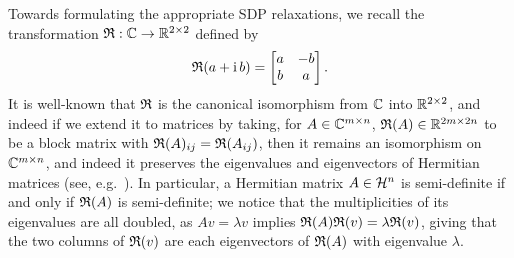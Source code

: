 Towards formulating the appropriate SDP relaxations, we recall the transformation $\mathfrak{R} : \mathbb{C} \to \mathbb{R}^{2 \times 2}$ %
defined by \[\mathfrak{R}(a + \mathrm{i}\, b) = \begin{bmatrix} a & -b \\ b & a \end{bmatrix}.\]  It is well-known that $\mathfrak{R}$ is the canonical isomorphism from $\mathbb{C}$ into $\mathbb{R}^{2 \times 2}$, and indeed if we extend it to matrices by taking, for $A \in \mathbb{C}^{m \times n}$, $\mathfrak{R}(A) \in \mathbb{R}^{2m \times 2n}$ to be a block matrix with $\mathfrak{R}(A)_{ij} = \mathfrak{R}(A_{ij})$, then it remains an isomorphism on $\mathbb{C}^{m \times n}$, and indeed it preserves the eigenvalues and eigenvectors of Hermitian matrices (see, e.g.~\cite[p.~101]{wedderburn1934matrices}).  In particular, a Hermitian matrix $A \in \mathcal{H}^n$ is semi-definite if and only if $\mathfrak{R}(A)$ is semi-definite; we notice that the multiplicities of its eigenvalues are all doubled, as $A v = \lambda v$ implies $\mathfrak{R}(A) \mathfrak{R}(v) = \lambda \mathfrak{R}(v)$, giving that the two columns of $\mathfrak{R}(v)$ are each eigenvectors of $\mathfrak{R}(A)$ with eigenvalue $\lambda$.

